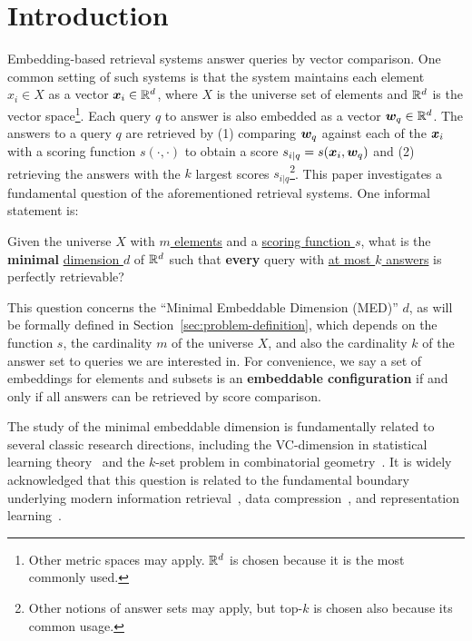 \section{Introduction}

Embedding-based retrieval systems answer queries by vector comparison. One common setting of such systems is that the system maintains each element $x_i\in X$ as a vector $\bm{x}_i\in \mathbb{R}^d$, where $X$ is the universe set of elements and $\mathbb{R}^d$ is the vector space\footnote{Other metric spaces may apply. $\mathbb{R}^d$ is chosen because it is the most commonly used.}.
Each query $q$ to answer is also embedded as a vector $\bm{w}_q\in \mathbb{R}^d$. The answers to a query $q$ are retrieved by (1) comparing $\bm{w}_q$ against each of the $\bm{x}_i$ with a scoring function $s(\cdot, \cdot)$ to obtain a score $s_{i|q} = s(\bm{x}_i, \bm{w}_q)$ and (2) retrieving the answers with the $k$ largest scores $s_{i|q}$\footnote{Other notions of answer sets may apply, but top-$k$ is chosen also because its common usage.}.
This paper investigates a fundamental question of the aforementioned retrieval systems. One informal statement is:
\begin{tcolorbox}[colback=yellow!20, colframe=black, sharp corners, boxrule=1pt]
Given the universe $X$ with \underline{$m$ elements} and a \underline{scoring function $s$}, what is the \textbf{minimal} \underline{dimension $d$} of $\mathbb{R}^d$ such that \textbf{every} query with \underline{at most $k$ answers} is perfectly retrievable?
\end{tcolorbox}
This question concerns the ``Minimal Embeddable Dimension (MED)'' $d$, as will be formally defined in Section~\ref{sec:problem-definition}, which depends on the function $s$, the cardinality $m$ of the universe $X$, and also the cardinality $k$ of the answer set to queries we are interested in. For convenience, we say a set of embeddings for elements and subsets is an \textbf{embeddable configuration} if and only if all answers can be retrieved by score comparison.

The study of the minimal embeddable dimension is fundamentally related to several classic research directions, including the VC-dimension in statistical learning theory~\citep{mohri2018foundations} and the $k$-set problem in combinatorial geometry~\citep{matousek2013lectures}. It is widely acknowledged that this question is related to the fundamental boundary underlying modern information retrieval~\citep{lee2019latent,weller2025mfollowir}, data compression~\citep{andoni2008near}, and representation learning~\citep{izacard2021unsupervised,wang2022text}.


